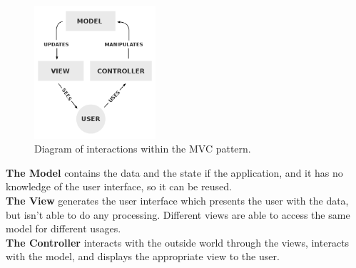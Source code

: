\begin{figure}[H]
	\centering
    \includegraphics[trim={0 0 0 0},clip,width=0.4\textwidth]{Files/MVC.png}
    \caption{Diagram of interactions within the MVC pattern.\cite{wiki:mvc} }
    \label{fig: MVC}
\end{figure}
\vspace{-3mm}

\textbf{The Model} contains the data and the state if the application, and it has no knowledge of the user interface, so it can be reused.\\
\textbf{The View} generates the user interface which presents the user with the data, but isn't able to do any processing. Different views are able to access the same model for different usages.\\
\textbf{The Controller} interacts with the outside world through the views, interacts with the model, and displays the appropriate view to the user.




